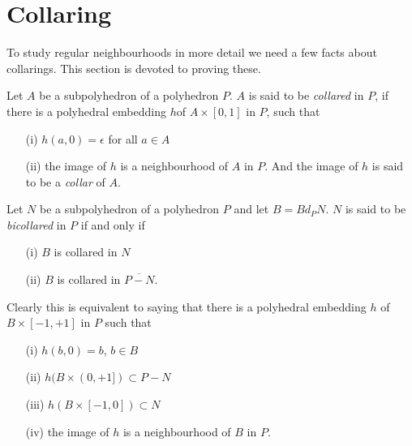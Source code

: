 \section{Collaring}\label{chap6-sec6.4}

To study regular neighbourhoods in more detail we need a few facts about collarings. This section is devoted to proving these.

\begin{definition}\label{chap6-defi6.4.1}
Let $A$ be a subpolyhedron of a polyhedron $P$. $A$ is said to be {\em collared} in $P$, if there is a polyhedral embedding $h$\pageoriginale of $A\times [0,1]$ in $P$, such that
\begin{itemize}
\item[(i)] $h(a,0)=\epsilon$ for all $a\in A$

\item[(ii)] the image of $h$ is a neighbourhood of $A$ in $P$. And the image of $h$ is said to be a {\em collar} of $A$. 
\end{itemize}
\end{definition}

\begin{definition}\label{chap6-defi6.4.2}
Let $N$ be a subpolyhedron of a polyhedron $P$ and let $B=Bd_{P}N$. $N$ is said to be {\em bicollared} in $P$ if and only if
\begin{itemize}
\item[(i)] $B$ is collared in $N$

\item[(ii)] $B$ is collared in $\overline{P-N}$.
\end{itemize}
\end{definition}

\setcounter{proposition}{1}
\begin{dashdefi}\label{chap6-dashdefi6.4.2}
Clearly this is equivalent to saying that there is a polyhedral embedding $h$ of $B\times[-1,+1]$ in $P$ such that
\begin{itemize}
\item[(i)] $h(b,0)=b$, $b\in B$

\item[(ii)] $h(B\times (0,+1])\subset P-N$

\item[(iii)] $h(B\times [-1,0])\subset N$

\item[(iv)] the image of $h$ is a neighbourhood of $B$ in $P$.
\end{itemize}
\end{dashdefi}


